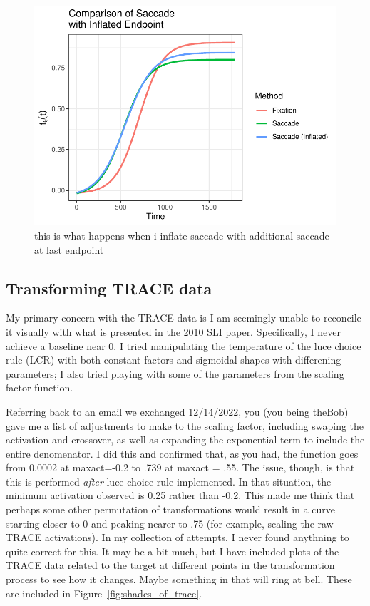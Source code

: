 \documentclass{article}
\begin{document}
\begin{figure}
\centering
\includegraphics{sac_inflate_compare.pdf}
\caption{this is what happens when i inflate saccade with additional saccade at last endpoint}
\label{fig:saccade_inflate}
\end{figure}

\subsection{Transforming TRACE data}


My primary concern with the TRACE data is I am seemingly unable to reconcile it visually with what is presented in the 2010 SLI paper. Specifically, I never achieve a baseline near 0. I tried manipulating the temperature of the luce choice rule (LCR) with both constant factors and sigmoidal shapes with differening parameters; I also tried playing with some of the parameters from the scaling factor function.


Referring back to an email we exchanged 12/14/2022, you (you being theBob) gave me a list of adjustments to make to the scaling factor, including swaping the activation and crossover, as well as expanding the exponential term to include the entire denomenator. I did this and confirmed that, as you had, the function goes from 0.0002 at maxact=-0.2 to .739 at maxact = .55. The issue, though, is that this is performed \textit{after} luce choice rule implemented. In that situation, the minimum activation observed is 0.25 rather than -0.2. This made me think that perhaps some other permutation of transformations would result in a curve starting closer to 0 and peaking nearer to .75 (for example, scaling the raw TRACE activations). In my collection of attempts, I never found anythning to quite correct for this. It may be a bit much, but I have included plots of the TRACE data related to the target at different points in the transformation process to see how it changes. Maybe something in that will ring at bell. These are included in  Figure~\ref{fig:shades_of_trace}. 
\end{document}
